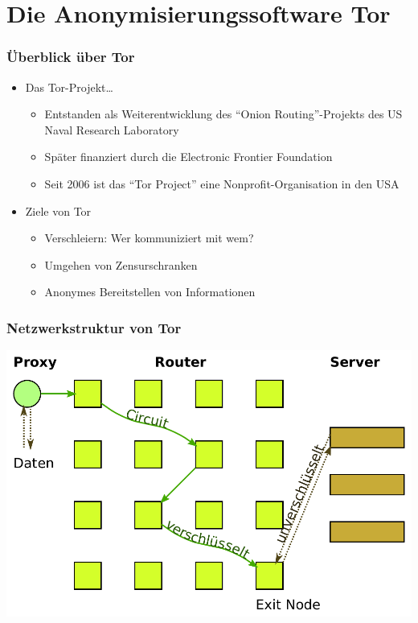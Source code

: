 \documentclass{beamer}
\begin{document}
\section{Die Anonymisierungssoftware Tor}

\begin{frame}
\frametitle{Überblick über Tor}

\begin{itemize}
	\item Das Tor-Projekt…
	\begin{itemize}
		\item Entstanden als Weiterentwicklung des “Onion Routing”-Projekts des US Naval Research Laboratory
		\item Später finanziert durch die Electronic Frontier Foundation
		\item Seit 2006 ist das “Tor Project” eine Nonprofit-Organisation in den USA
	\end{itemize}

	\item Ziele von Tor
	\begin{itemize}
		\item Verschleiern: Wer kommuniziert mit wem?
		\item Umgehen von Zensurschranken
		\item Anonymes Bereitstellen von Informationen
	\end{itemize}
\end{itemize}
	
\end{frame}

\begin{frame}
\frametitle{Netzwerkstruktur von Tor}

\includegraphics[width=\textwidth]{images/circuit.pdf}
\end{frame}
\end{document}
